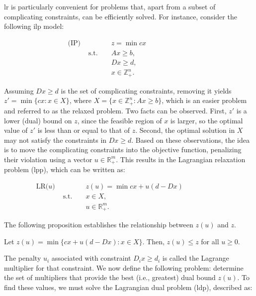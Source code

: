 \gls{lr} is particularly convenient for problems that, apart from a subset of
complicating constraints, can be efficiently solved. For instance, consider the
following \gls{ilp} model:

\begin{align*}
	\text{(IP) } &              &  & z = \min cx           &  &  &  &  &  &  &  &   \\
	             & \text{s.t. } &  & Ax \geq b,            &  &  &  &  &  &  &  &   \\
	             &              &  & Dx \geq d,            &  &  &  &  &  &  &  &   \\
	             &              &  & x \in \mathbb{Z}^n_+. &  &  &  &  &  &  &  & 
\end{align*}

Assuming $Dx \geq d$ is the set of complicating constraints, removing it yields
$z' = \min \{cx : x \in X\}$, where $X = \{x \in \mathbb{Z}^n_+ : Ax \geq b\}$,
which is an easier problem and referred to as the relaxed problem. Two facts can
be observed. First, $z'$ is a lower (dual) bound on $z$, since the feasible
region of $x$ is larger, so the optimal value of $z'$ is less than or equal to
that of $z$. Second, the optimal solution in $X$ may not satisfy the constraints
in $Dx \geq d$. Based on these observations, the idea is to move the
complicating constraints into the objective function, penalizing their violation
using a vector $u \in \mathbb{R}^{m}_+$. This results in the Lagrangian
relaxation problem (\gls{lpp}), which can be written as:

\begin{align*}
	\text{LR($u$) } &              &  & z(u) = \min cx + u(d - Dx) &  &  &  &  &  &  &   \\
	                & \text{s.t. } &  & x \in X,                   &  &  &  &  &  &  &   \\
	                &              &  & u \in \mathbb{R}^m_+.      &  &  &  &  &  &  & 
\end{align*}

The following proposition establishes the relationship between $z(u)$ and $z$.

\begin{proposition}
	Let $z(u) = \min \{cx + u (d - Dx) : x \in X\}$. Then, $z(u) \leq z$ for all $u \geq 0$.
\end{proposition}

The penalty $u_i$ associated with constraint $D_ix \geq d_i$ is called the
Lagrange multiplier for that constraint. We now define the following problem:
determine the set of multipliers that provide the best (i.e., greatest) dual
bound $z(u)$. To find these values, we must solve the Lagrangian dual problem
(\gls{ldp}), described as:

